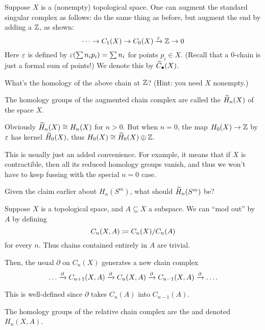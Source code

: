 \begin{example}
	Suppose $X$ is a (nonempty) topological space.
	One can augment the standard singular complex as follows:
	do the same thing as before, but augment the end by adding a $\mathbb Z$,
	as shown:
	\[ \dots \to C_1(X) \to C_0(X) \xrightarrow{\varepsilon} \mathbb Z \to 0 \]
	Here $\varepsilon$ is defined by $\varepsilon(\sum n_ip_i) = \sum n_i$ for points $p_i \in X$.
	(Recall that a $0$-chain is just a formal sum of points!)
	We denote this  by $\widetilde C_\bullet(X)$.
\end{example}
\begin{ques}
	What's the homology of the above chain at $\mathbb Z$?
	(Hint: you need $X$ nonempty.)
\end{ques}
\begin{definition}
	\label{def:augment}
	The homology groups of the augmented chain complex are called the
	 $\widetilde H_n(X)$ of the space $X$.

	Obviously $\widetilde H_n(X) \cong H_n(X)$ for $n > 0$.
	But when $n=0$, the map $H_0(X) \to \mathbb Z$ by $\varepsilon$ has kernel $\widetilde H_0(X)$,
	thus $H_0(X) \cong \widetilde H_0(X) \oplus \mathbb Z$.
\end{definition}
This is usually just an added convenience.
For example, it means that if $X$ is contractible,
then all its reduced homology groups vanish,
and thus we won't have to keep fussing with the special $n=0$ case.
\begin{ques}
	Given the claim earlier about $H_n(S^m)$, what should $\widetilde H_n(S^m)$ be?
\end{ques}

\begin{example}
	Suppose $X$ is a topological space, and $A \subseteq X$ a subspace.
	We can ``mod out'' by $A$ by defining
	\[ C_n(X,A) \coloneqq C_n(X) / C_n(A) \]
	for every $n$. Thus chains contained entirely in $A$ are trivial.

	Then, the usual $\partial$ on $C_n(X)$ generates a new chain complex
	\[ \dots \xrightarrow{\partial} C_{n+1}(X,A) \xrightarrow{\partial} C_n(X,A)
	\xrightarrow{\partial} C_{n-1}(X,A) \xrightarrow{\partial} \dots. \]

	This is well-defined since $\partial$ takes $C_n(A)$ into $C_{n-1}(A)$.
\end{example}
\begin{definition}
	The homology groups of the relative chain complex are the
	 and denoted $H_n(X,A)$.
\end{definition}

